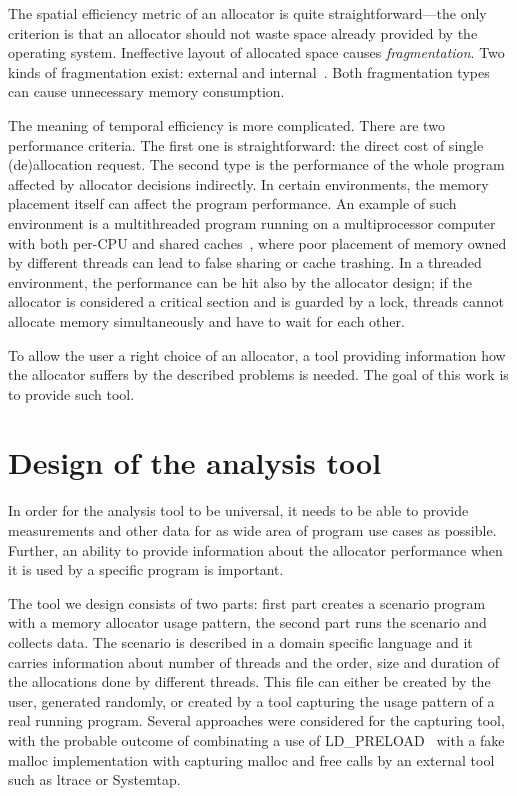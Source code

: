 \documentclass{eeict}
\begin{document}
The spatial efficiency metric of an allocator is quite straightforward---the only criterion is that an allocator should not waste space already provided by the operating system. Ineffective layout of allocated space causes {\em fragmentation}. Two kinds of fragmentation exist: external and internal~\cite{dsa}. Both fragmentation types can cause unnecessary memory consumption.

The meaning of temporal efficiency is  more complicated. There are two performance criteria. The first one is straightforward: the direct cost of single (de)allocation request. The second type is the performance of the whole program affected by allocator decisions indirectly. In certain environments, the memory placement itself can affect the program performance. An example of such environment is a multithreaded program running on a multiprocessor computer with both per-CPU and shared caches~\cite{drepper}, where poor placement of memory owned by different threads can lead to false sharing or cache trashing. In a threaded environment, the performance can be hit also by the allocator design; if the allocator is considered a critical section and is guarded by a lock, threads cannot allocate memory simultaneously and have to wait for each other.

To allow the user a right choice of an allocator, a tool providing information how the allocator suffers by the described problems is needed. The goal of this work is to provide such tool.

\section{Design of the analysis tool}

In order for the analysis tool to be universal, it needs to be able to provide measurements and other data for as wide area of program use cases as possible. Further, an ability to provide information about the allocator performance when it is used by a specific program is important.

The tool we design consists of two parts: first part creates a scenario program with a memory allocator usage pattern, the second part runs the scenario and collects data. The scenario is described in a domain specific language and it carries information about number of threads and the order, size and duration of the allocations done by different threads. This file can either be created by the user, generated randomly, or created by a tool capturing the usage pattern of a real running program. Several approaches were considered for the capturing tool, with the probable outcome of combinating a use of LD\_PRELOAD~\cite{cman} with a fake malloc implementation with capturing malloc and free calls by an external tool such as ltrace or Systemtap.
\end{document}
